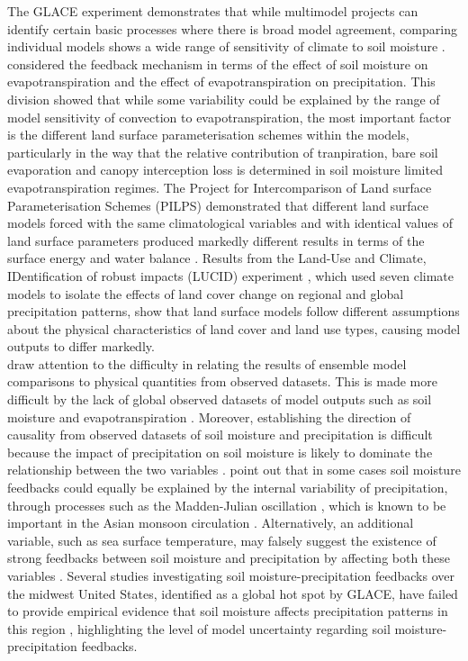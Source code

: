 \documentclass{icldt}\usepackage[]{graphicx}\usepackage[]{color}
\begin{document}
The GLACE experiment demonstrates that while multimodel projects can identify certain basic processes where there is broad model agreement, comparing individual models shows a wide range of sensitivity of climate to soil moisture \citep{Seneviratne2010}. \citet{Guo2006} considered the feedback mechanism in terms of the effect of soil moisture on evapotranspiration and the effect of evapotranspiration on precipitation. This division showed that while some variability could be explained by the range of model sensitivity of convection to evapotranspiration, the most important factor is the different land surface parameterisation schemes within the models, particularly in the way that the relative contribution of tranpiration, bare soil evaporation and canopy interception loss is determined in soil moisture limited evapotranspiration regimes. The Project for Intercomparison of Land surface Parameterisation Schemes (PILPS) \citep[e.g.][]{Henderson1995,Henderson1996} demonstrated that different land surface models forced with the same climatological variables and with identical values of land surface parameters produced markedly different results in terms of the surface energy and water balance \citep{Chen1997}. Results from the Land-Use and Climate, IDentification of robust impacts (LUCID) experiment \citep{Henderson1995,Guo2006,Pitman2009}, which used seven climate models to isolate the effects of land cover change on regional and global precipitation patterns, show that land surface models follow different assumptions about the physical characteristics of land cover and land use types, causing model outputs to differ markedly. \\

\citet{Dirmeyer2006a} draw attention to the difficulty in relating the results of ensemble model comparisons to physical quantities from observed datasets. This is made more difficult by the lack of global observed datasets of model outputs such as soil moisture and evapotranspiration \citep{Betts1996,Dirmeyer2006a,Seneviratne2010}. Moreover, establishing the direction of causality from observed datasets of soil moisture and precipitation is difficult because the impact of precipitation on soil moisture is likely to dominate the relationship between the two variables \citep{Seneviratne2010}. \citet{Wei2008} point out that in some cases soil moisture feedbacks could equally be explained by the internal variability of precipitation, through processes such as the Madden-Julian oscillation \citep{Madden1971,Madden1972}, which is known to be important in the Asian monsoon circulation \citep{Webster1987a,Zhang2005}. Alternatively, an additional variable, such as sea surface temperature, may falsely suggest the existence of strong feedbacks between soil moisture and precipitation by affecting both these variables \citep{Notaro2006,Orlowsky2010}. Several studies investigating soil moisture-precipitation feedbacks over the midwest United States, identified as a global hot spot by GLACE, have failed to provide empirical evidence that soil moisture affects precipitation patterns in this region \citep[e.g.][]{Findell1997,Salvucci2002,Alfieri2008}, highlighting the level of model uncertainty regarding soil moisture-precipitation feedbacks. \\
\end{document}
